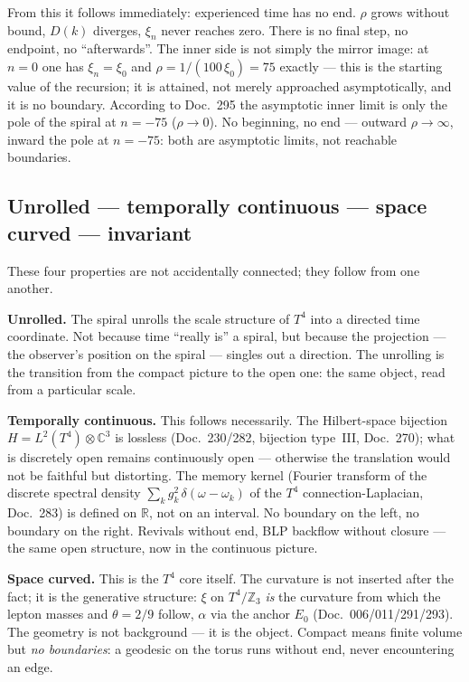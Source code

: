 From this it follows immediately: experienced time has no end. $\rho$ grows
without bound, $D(k)$ diverges, $\xi_n$ never reaches zero. There is no final
step, no endpoint, no \enquote{afterwards}. The inner side is not simply the
mirror image: at $n=0$ one has $\xi_n=\xi_0$ and $\rho=1/(100\,\xi_0)=75$
exactly --- this is the starting value of the recursion; it is attained, not
merely approached asymptotically, and it is no boundary. According to
Doc.~295 the asymptotic inner limit is only the pole of the spiral at
$n=-75$ ($\rho\to0$). No beginning, no end --- outward $\rho\to\infty$,
inward the pole at $n=-75$: both are asymptotic limits, not reachable
boundaries.

\subsection*{Unrolled --- temporally continuous --- space curved ---
invariant}

These four properties are not accidentally connected; they follow from one
another.

\textbf{Unrolled.} The spiral unrolls the scale structure of $T^4$ into a
directed time coordinate. Not because time \enquote{really is} a spiral, but
because the projection --- the observer's position on the spiral --- singles
out a direction. The unrolling is the transition from the compact picture to
the open one: the same object, read from a particular scale.

\textbf{Temporally continuous.} This follows necessarily. The Hilbert-space
bijection $H = L^2(T^4) \otimes \mathbb{C}^3$ is lossless (Doc.~230/282,
bijection type~III, Doc.~270); what is discretely open remains continuously
open --- otherwise the translation would not be faithful but distorting. The
memory kernel (Fourier transform of the discrete spectral density
$\sum_k g_k^2\,\delta(\omega - \omega_k)$ of the $T^4$ connection-Laplacian,
Doc.~283) is defined on $\mathbb{R}$, not on an interval. No boundary on the
left, no boundary on the right. Revivals without end, BLP backflow without
closure --- the same open structure, now in the continuous picture.

\textbf{Space curved.} This is the $T^4$ core itself. The curvature is not
inserted after the fact; it is the generative structure: $\xi$ on
$T^4/\mathbb{Z}_3$ \emph{is} the curvature from which the lepton masses and
$\theta = 2/9$ follow, $\alpha$ via the anchor $E_0$ (Doc.~006/011/291/293). The geometry is
not background --- it is the object. Compact means finite volume but
\emph{no boundaries}: a geodesic on the torus runs without end, never
encountering an edge.

